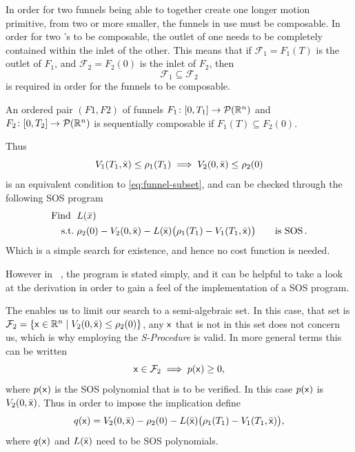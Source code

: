 In order for two funnels being able to together create one longer motion
primitive, from two or more smaller, the funnels in use must be composable. In
order for two \funnel's to be composable, the outlet of one \funnel{} needs to
be completely contained within the inlet of the other. This means that if
\(\mathcal{F}_1 = F_1(T)\) is the outlet of \funnel{} \(F_1\), and
\(\mathcal{F}_2 = F_2(0)\) is the inlet of \(F_2\), then
\begin{equation}
  \label{eq:funnel-subset}
  \mathcal{F}_1 \subseteq \mathcal{F}_2
\end{equation}
is required in order for the funnels to be composable.
\begin{definition}
  \label{def:funnel-composition}
  An ordered pair \((F1, F2)\) of funnels \(F_1 \colon [0,T_1] \rightarrow
  \mathcal{P}(\mathbb{R}^n)\) and \(F_2 \colon [0,T_2] \rightarrow \mathcal{P}(\mathbb{R}^n)\)
  is sequentially composable if \(F_1(T) \subseteq F_2(0)\).
\end{definition}
Thus
\begin{equation}
  V_1(T_1,\bar{{\mathbf{\mathsf{x}}}}) \leq \rho_1(T_1) \implies V_2(0,\bar{{\mathbf{\mathsf{x}}}}) \leq
  \rho_2(0)
\end{equation}
is an equivalent condition to \cref{eq:funnel-subset}, and can be checked
through the following \ac{SOS} program
\begin{align}
  \text{Find } \; &L(\bar{x})  \\
  \text{s.t.} \; &\rho_2(0) - V_2( 0,\bar{{\mathbf{\mathsf{x}}}}) - L(\bar{{\mathbf{\mathsf{x}}}})
                  \bigl( \rho_1(T_1) - V_1(T_1,\bar{{\mathbf{\mathsf{x}}}}) \bigr) \qquad \text{is SOS} \, . \nonumber
\end{align}
Which is a simple search for existence, and hence no cost function is needed.

However in
\citeauthor{majumdarFunnelLibrariesRealtime2017}~\cite{majumdarFunnelLibrariesRealtime2017},
the program is stated simply, and it can be helpful to take a look at the
derivation in order to gain a feel of the implementation of a \ac{SOS} program.

The  enables us to limit our search to a semi-algebraic
set. In this case, that set is \(\mathcal{F}_2 = \lbrace{\mathbf{\mathsf{x}}} \in \mathbb{R}^n \mid
  V_2(0,\bar{{\mathbf{\mathsf{x}}}}) \leq \rho_2(0)\rbrace\), any \({\mathbf{\mathsf{x}}}\) that is not in this
set does not concern us, which is why employing the \textit{S-Procedure} is
valid. In more general terms this can be written
\begin{equation}
  {\mathbf{\mathsf{x}}} \in \mathcal{F}_2 \implies p({\mathbf{\mathsf{x}}}) \geq 0,
\end{equation}
where \(p({\mathbf{\mathsf{x}}})\) is the \ac{SOS} polynomial that is to be verified. In this
case \(p({\mathbf{\mathsf{x}}})\) is \(V_2(0,\bar{{\mathbf{\mathsf{x}}}})\). Thus in order to impose the
implication define
\begin{equation}
  q({\mathbf{\mathsf{x}}}) = V_2(0,\bar{{\mathbf{\mathsf{x}}}}) - \rho_2(0) - L(\bar{{\mathbf{\mathsf{x}}}}) \bigl(
    \rho_1(T_1) - V_1(T_1,\bar{{\mathbf{\mathsf{x}}}}) \bigr),
\end{equation}
where \(q({\mathbf{\mathsf{x}}})\) and \(L(\bar{{\mathbf{\mathsf{x}}}})\) need to be SOS polynomials.

